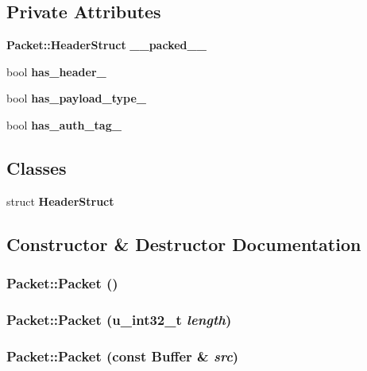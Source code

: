 \subsection*{Private Attributes}
\begin{CompactItemize}
\item 
{\bf Packet::Header\-Struct} {\bf \_\-\_\-packed\_\-\_\-}
\item 
bool {\bf has\_\-header\_\-}
\item 
bool {\bf has\_\-payload\_\-type\_\-}
\item 
bool {\bf has\_\-auth\_\-tag\_\-}
\end{CompactItemize}
\subsection*{Classes}
\begin{CompactItemize}
\item 
struct {\bf Header\-Struct}
\end{CompactItemize}


\subsection{Constructor \& Destructor Documentation}
\subsubsection{\setlength{\rightskip}{0pt plus 5cm}Packet::Packet ()}\label{classPacket_abcfb963c0d5bc0fa554668f92989622}


\subsubsection{\setlength{\rightskip}{0pt plus 5cm}Packet::Packet ({\bf u\_\-int32\_\-t} {\em length})}\label{classPacket_d2a8f6ac3d6de9b541708c4b0c73d04b}


\subsubsection{\setlength{\rightskip}{0pt plus 5cm}Packet::Packet (const {\bf Buffer} \& {\em src})}\label{classPacket_27264b7d411a74ea9a0077bf5f9222b1}




